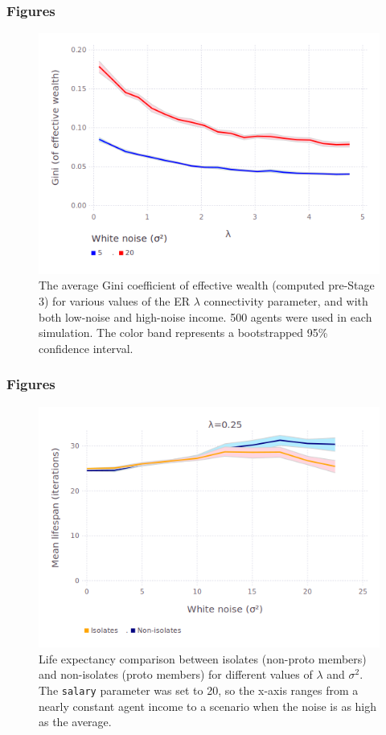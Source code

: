 \documentclass{beamer}
\begin{document}
\begin{frame}[t]
\frametitle{Figures}
\begin{figure}[hb]
\centering
\includegraphics[scale=.4]{figures/giniVsLambda.png}
\caption{The average Gini coefficient of effective wealth (computed pre-Stage 3) for various values of the ER $\lambda$ connectivity parameter, and with both low-noise and high-noise income. 500 agents were used in each simulation. The color band represents a bootstrapped 95\% confidence interval.}
\label{fig:giniVsLambda}
\end{figure}
\end{frame}

\begin{frame}[t]
\frametitle{Figures}
\begin{figure}[ht]
\centering
\includegraphics[scale=.4]{figures/avgLifespanLambda_025.png}
\caption{Life expectancy comparison between isolates (non-proto members) and
non-isolates (proto members) for different values of $\lambda$ and $\sigma^2$.
The \texttt{salary} parameter was set to 20, so the x-axis ranges from a nearly
constant agent income to a scenario when the noise is as high as the average.}
\label{fig:avgLifespanLambda}
\end{figure}
\end{frame}
\end{document}
